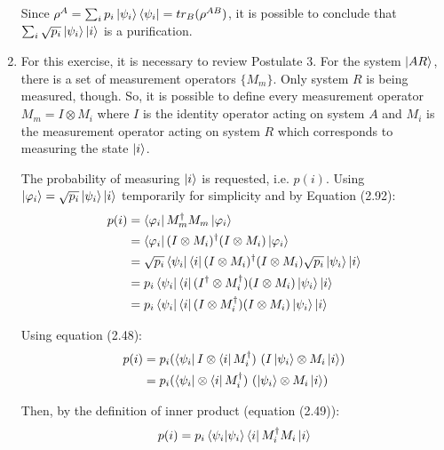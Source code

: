 \begin{enumerate}
    Since $\rho^A = \sum_i p_i \ket{\psi_i}\bra{\psi_i} = tr_B(\rho^{AB})$,
    it is possible to conclude that $\sum_i \sqrt{p_i} \ket{\psi_i}\ket{i}$ is a purification.


\item {}

    For this exercise, it is necessary to review Postulate 3. For the system $\ket{AR}$, there is a set of measurement operators $\{M_m\}$. Only system $R$ is being measured, though. So, it is possible to define every measurement operator $M_m = I \otimes M_i$ where $I$ is the identity operator acting on system $A$ and $M_i$ is the measurement operator acting on system $R$ which corresponds to measuring the state $\ket{i}$.
    
    The probability of measuring $\ket{i}$ is requested, i.e. $p(i)$. Using $\ket{\varphi_i} = \sqrt{p_i}\ket{\psi_i} \ket{i}$ temporarily for simplicity and by Equation (2.92):
    \begin{align}
        p(i) &= \bra{\varphi_i}M_m^\dagger M_m \ket{\varphi_i} \\
        &= \bra{\varphi_i}(I \otimes M_i)^\dagger (I \otimes M_i) \ket{\varphi_i} \\
        &= \sqrt{p_i} \bra{\psi_i}\bra{i}(I \otimes M_i)^\dagger
            (I \otimes M_i) \sqrt{p_i}\ket{\psi_i}\ket{i} \\
        &= p_i \bra{\psi_i}\bra{i}(I^\dagger \otimes M_i^\dagger)
            (I \otimes M_i) \ket{\psi_i}\ket{i} \\
        &= p_i \bra{\psi_i}\bra{i}(I \otimes M_i^\dagger)
            (I \otimes M_i) \ket{\psi_i}\ket{i}
    \end{align}
    
    Using equation (2.48):
    \begin{align}
        p(i) &= p_i (\bra{\psi_i}I \otimes \bra{i}M_i^\dagger)
            \ (I\ket{\psi_i} \otimes M_i\ket{i}) \\
        &= p_i (\bra{\psi_i} \otimes \bra{i}M_i^\dagger )
            \ (\ket{\psi_i} \otimes M_i\ket{i})
    \end{align}
    
    Then, by the definition of inner product (equation (2.49)):
    \begin{align}
        p(i) = p_i \braket{\psi_i|\psi_i} \bra{i}M_i^\dagger M_i\ket{i}
    \end{align}
    

\end{enumerate}
